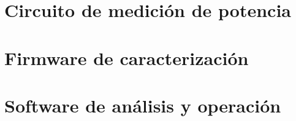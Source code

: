 \section{Circuito de medición de potencia}
\label{sec:medicion_impl}


\section{Firmware de caracterización}
\label{sec:firmware_impl}


\section{Software de análisis y operación}
\label{sec:software_impl}


